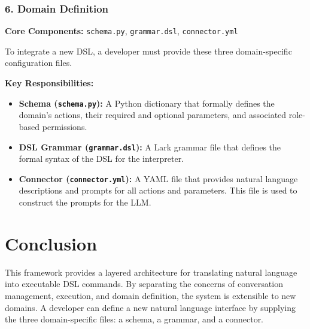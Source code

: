 \documentclass[12pt, a4paper]{article}
\begin{document}
\subsubsection{6. Domain Definition}
\textbf{Core Components:} \texttt{schema.py}, \texttt{grammar.dsl}, \texttt{connector.yml}

To integrate a new DSL, a developer must provide these three domain-specific configuration files.

\textbf{Key Responsibilities:}
\begin{itemize}
    \item \textbf{Schema (\texttt{schema.py}):} A Python dictionary that formally defines the domain's actions, their required and optional parameters, and associated role-based permissions.
    \item \textbf{DSL Grammar (\texttt{grammar.dsl}):} A Lark grammar file that defines the formal syntax of the DSL for the interpreter.
    \item \textbf{Connector (\texttt{connector.yml}):} A YAML file that provides natural language descriptions and prompts for all actions and parameters. This file is used to construct the prompts for the LLM.
\end{itemize}

\section{Conclusion}
This framework provides a layered architecture for translating natural language into executable DSL commands. By separating the concerns of conversation management, execution, and domain definition, the system is extensible to new domains. A developer can define a new natural language interface by supplying the three domain-specific files: a schema, a grammar, and a connector.
\end{document}
